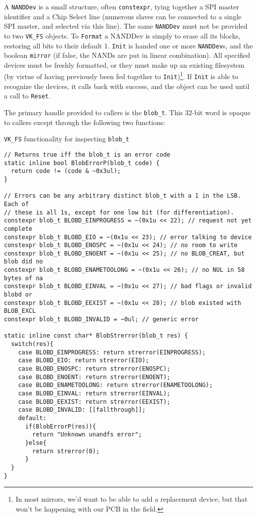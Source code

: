 \documentclass[letterpaper,10pt]{article}
\begin{document}
A {\texttt{NANDDev}} is a small structure, often {\texttt{constexpr}}, tying
together a SPI master identifier and a Chip Select line (numerous slaves can be
connected to a single SPI master, and selected via this line). The same {\texttt{NANDDev}}
must not be provided to two {\texttt{VK\_FS}} objects. To {\texttt{Format}} a
NANDDev is simply to erase all its blocks, restoring all bits to their default
1. {\texttt{Init}} is handed one or more {\texttt{NANDDev}}s, and the boolean
{\texttt{mirror}} (if false, the NANDs are put in linear combination). All
specified devices must be freshly formatted, or they must make up an existing
filesystem (by virtue of having previously been fed together to
{\texttt{Init}})\footnote{In most mirrors, we'd want to be able to add a
  replacement device, but that won't be happening with our PCB in the field.}.
If {\texttt{Init}} is able to recognize the devices, it calls back with
success, and the object can be used until a call to {\texttt{Reset}}.

The primary handle provided to callers is the {\texttt{blob\_t}}. This 32-bit
word is opaque to callers except through the following two functions:

\begin{listing}[ht]
\caption{{\texttt{VK\_FS}} functionality for inspecting {\texttt{blob\_t}}}
\begin{verbatim}
// Returns true iff the blob_t is an error code
static inline bool BlobErrorP(blob_t code) {
  return code != (code & ~0x3ul);
}

// Errors can be any arbitrary distinct blob_t with a 1 in the LSB. Each of
// these is all 1s, except for one low bit (for differentiation).
constexpr blob_t BLOBD_EINPROGRESS = ~(0x1u << 22); // request not yet complete
constexpr blob_t BLOBD_EIO = ~(0x1u << 23); // error talking to device
constexpr blob_t BLOBD_ENOSPC = ~(0x1u << 24); // no room to write
constexpr blob_t BLOBD_ENOENT = ~(0x1u << 25); // no BLOB_CREAT, but blob did no
constexpr blob_t BLOBD_ENAMETOOLONG = ~(0x1u << 26); // no NUL in 58 bytes of na
constexpr blob_t BLOBD_EINVAL = ~(0x1u << 27); // bad flags or invalid blobd or
constexpr blob_t BLOBD_EEXIST = ~(0x1u << 28); // blob existed with BLOB_EXCL
constexpr blob_t BLOBD_INVALID = ~0ul; // generic error

static inline const char* BlobStrerror(blob_t res) {
  switch(res){
    case BLOBD_EINPROGRESS: return strerror(EINPROGRESS);
    case BLOBD_EIO: return strerror(EIO);
    case BLOBD_ENOSPC: return strerror(ENOSPC);
    case BLOBD_ENOENT: return strerror(ENOENT);
    case BLOBD_ENAMETOOLONG: return strerror(ENAMETOOLONG);
    case BLOBD_EINVAL: return strerror(EINVAL);
    case BLOBD_EEXIST: return strerror(EEXIST);
    case BLOBD_INVALID: [[fallthrough]];
    default:
      if(BlobErrorP(res)){
        return "Unknown unandfs error";
      }else{
        return strerror(0);
      }
  }
}
\end{verbatim}
\end{listing}
\end{document}
